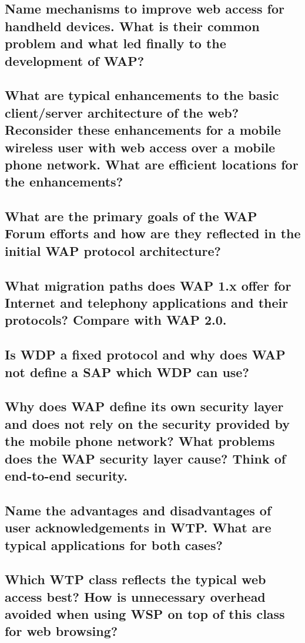 \subsection{Name mechanisms to improve web access for handheld devices. What is their
common problem and what led finally to the development of WAP?}

\subsection{What are typical enhancements to the basic client/server architecture of the web?
Reconsider these enhancements for a mobile wireless user with web access over a
mobile phone network. What are efficient locations for the enhancements?}

\subsection{What are the primary goals of the WAP Forum efforts and how are they reflected in
the initial WAP protocol architecture?}

\subsection{What migration paths does WAP 1.x offer for Internet and telephony applications and
their protocols? Compare with WAP 2.0.}

\subsection{Is WDP a fixed protocol and why does WAP not define a SAP which WDP can use?}

\subsection{Why does WAP define its own security layer and does not rely on the security
provided by the mobile phone network? What problems does the WAP security layer
cause? Think of end-to-end security.}

\subsection{Name the advantages and disadvantages of user acknowledgements in WTP. What
are typical applications for both cases?}

\subsection{Which WTP class reflects the typical web access best? How is unnecessary
overhead avoided when using WSP on top of this class for web browsing?}

